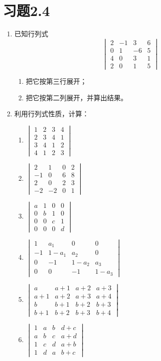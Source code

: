 \section*{习题2.4}
\begin{enumerate}
    \item 已知行列式
\[\begin{vmatrix}
    2 &-1&3&6\\
    0&1&-6&5\\
    4&0&3&1\\
    2&0&1&5
\end{vmatrix}\]
    \begin{enumerate}
        \item 把它按第三行展开；
        \item 把它按第二列展开，并算出结果。
    \end{enumerate}
\item 利用行列式性质，计算：
\begin{multicols}{2}
\begin{enumerate}
    \item $\begin{vmatrix}
   1&2&3&4\\2&3&4&1\\3&4&1&2\\4&1&2&3     
    \end{vmatrix}$
    \item $\begin{vmatrix}
        2&1&0&2\\-1&0&6&8\\2&0&2&3\\-2&-2&0&1
    \end{vmatrix}$
    \item $\begin{vmatrix}
        a&1&0&0\\0&b&1&0\\0&0&c&1\\0&0&0&d
    \end{vmatrix}$
    \item $\begin{vmatrix}
        1&a_1&0&0\\-1&1-a_1&a_2&0\\
        0&-1&1-a_2&a_3\\0&0&-1&1-a_3
    \end{vmatrix}$
    \item $\begin{vmatrix}
        a&a+1&a+2&a+3\\
        a+1&a+2&a+3&a+4\\
        b&b+1&b+2&b+3\\
        b+1&b+2&b+3&b+4
    \end{vmatrix}$
    \item $\begin{vmatrix}
        1&a&b&d+c\\a&b&c&a+d\\1&c&d&a+b\\1&d&a&b+c
    \end{vmatrix}$
\end{enumerate}
\end{multicols}


\end{enumerate}
